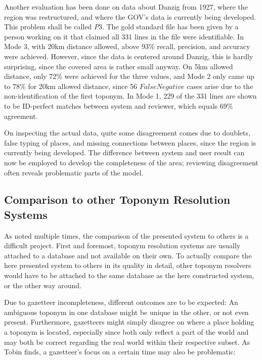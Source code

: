 \documentclass[11pt]{article}
\begin{document}
Another evaluation has been done on data about Danzig from 1927, where the region was restructured, and where the GOV's data is currently being developed. This problem shall be called $P3$. The gold standard file has been given by a person working on it that claimed all 331 lines in the file were identifiable. In Mode 3, with 20km distance allowed, above 93\% recall, precision, and accuracy were achieved. However, since the data is centered around Danzig, this is hardly surprising, since the covered area is rather small anyway. On 5km allowed distance, only 72\% were achieved for the three values, and Mode 2 only came up to 78\% for 20km allowed distance, since 56 $FalseNegative$ cases arise due to the non-identification of the first toponym. In Mode 1, 229 of the 331 lines are shown to be ID-perfect matches between system and reviewer, which equals 69\% agreement.

On inspecting the actual data, quite some disagreement comes due to doublets, false typing of places, and missing connections between places, since the region is currently being developed. The difference between system and user result can now be employed to develop the completeness of the area; reviewing disagreement often reveals problematic parts of the model.

\subsection{Comparison to other Toponym Resolution Systems}

As noted multiple times, the comparison of the presented system to others is a difficult project. First and foremost, toponym resolution systems are usually attached to a database and not available on their own. To actually compare the here presented system to others in its quality in detail, other toponym resolvers would have to be attached to the same database as the here constructed system, or the other way around.

Due to gazetteer incompleteness, different outcomes are to be expected: An ambiguous toponym in one database might be unique in the other, or not even present. Furthermore, gazetteers might simply disagree on where a place holding a toponym is located, especially since both only reflect a part of the world and may both be correct regarding the real world within their respective subset. As Tobin finds, a gazetteer's focus on a certain time may also be problematic:
\end{document}

